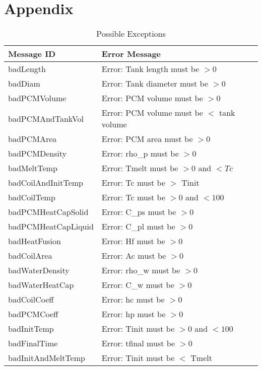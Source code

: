 \documentclass[12pt]{article}
\begin{document}
\section{Appendix} \label{Appendix}
\renewcommand{\arraystretch}{1.2}
\begin{longtable}{l p{12cm}}
\caption{Possible Exceptions} \\
\toprule
\textbf{Message ID} & \textbf{Error Message} \\
\midrule
badLength & Error: Tank length must be $> 0$ \\
badDiam & Error: Tank diameter must be $> 0$ \\
badPCMVolume & Error: PCM volume must be $> 0$ \\
badPCMAndTankVol & Error: PCM volume must be $<$ tank volume \\
badPCMArea & Error: PCM area must be $> 0$ \\
badPCMDensity & Error: rho\_p must be $> 0$ \\
badMeltTemp & Error: Tmelt must be $> 0$ and $< Tc$ \\
badCoilAndInitTemp & Error: Tc must be $>$ Tinit \\
badCoilTemp & Error: Tc must be $> 0$ and $< 100$ \\
badPCMHeatCapSolid & Error: C\_ps must be $> 0$ \\
badPCMHeatCapLiquid & Error: C\_pl must be $> 0$ \\
badHeatFusion & Error: Hf must be $> 0$ \\
badCoilArea & Error: Ac must be $> 0$ \\
badWaterDensity & Error: rho\_w must be $> 0$ \\
badWaterHeatCap & Error: C\_w must be $> 0$ \\
badCoilCoeff & Error: hc must be $> 0$ \\
badPCMCoeff & Error: hp must be $> 0$ \\
badInitTemp & Error: Tinit must be $> 0$ and $< 100$ \\
badFinalTime & Error: tfinal must be $> 0$ \\
badInitAndMeltTemp & Error: Tinit must be $<$ Tmelt \\
\bottomrule
\end{longtable}
\end{document}
